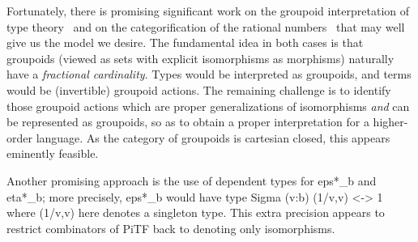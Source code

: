 \documentclass[preprint]{sigplanconf}
\begin{document}
Fortunately, there is promising significant work on the groupoid
interpretation of type theory~\cite{Hofmann96thegroupoid} and on the 
categorification of the rational numbers~\cite{math/9802029} that may well give
us the model we desire.  The fundamental idea in both cases is that groupoids
(viewed as sets with explicit isomorphisms as morphisms) naturally have a
\emph{fractional cardinality}.  Types would be interpreted as groupoids, and
terms would be (invertible) groupoid actions.  The remaining challenge is to
identify those groupoid actions which are proper generalizations of
isomorphisms \emph{and} can be represented as groupoids, so as to obtain a
proper interpretation for a higher-order language.  As the category of
groupoids is cartesian closed, this appears eminently feasible.

Another promising approach is the use of dependent types for {{eps*_b}} and
{{eta*_b}}; more precisely, {{eps*_b}} would have type 
{{Sigma (v:b) (1/v,v) <-> 1}} where {{(1/v,v)}} here denotes a singleton type.
This extra precision appears to restrict combinators of {{PiTF}} back to
denoting only isomorphisms.



\end{document}
